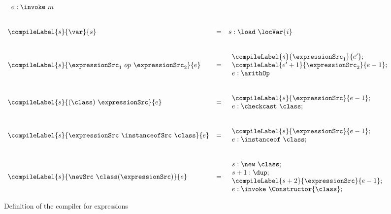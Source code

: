 \begin{figure}[ht!]
\begin{frameit}
$${\begin{array}{lll}
\begin{array}{l}
		  e  :\invoke \ m
            \end{array}  \\
	& & \\ & & \\
	\compileLabel{s}{ \var }{s} & = &   s: \load \ \locVar{i} \\
	& & \\ & & \\
	\compileLabel{s}{ \expressionSrc_1 \ op \ \expressionSrc_2 }{e} & = &  
                 \begin{array}{l}
                       \compileLabel{s}{ \expressionSrc_1}{  e'  } ; \\
                       \compileLabel{e' + 1}{ \expressionSrc_2}{ e - 1  }; \\
                       e:\arithOp
                 \end{array}  \\
	& & \\ & & \\
	\compileLabel{s}{ (\class ) \ \expressionSrc }{e} & = &  
              \begin{array}{l}  
                 \compileLabel{s}{\expressionSrc}{e  - 1};\\
                  e : \checkcast \ \class ;
              \end{array}	 \\
	& & \\ & & \\ 

	\compileLabel{s}{\expressionSrc \ \instanceofSrc \ \class }{e} & = &  
         \begin{array}{l}
              \compileLabel{s}{\expressionSrc}{ e  -1 };\\
               e : \instanceof \ \class;
	  \end{array} \\
	  & & \\ & & \\ 
\compileLabel{s}{ \newSrc \ \class  (\expressionSrc ) }{e} & = & 
                 \begin{array}{l}
                       s :    \new \ \class; \\ 
		       s + 1: \dup; \\
		       \compileLabel{s+2}{\expressionSrc}{e - 1 };\\
	               
		       e : \invoke \ \Constructor{\class};     
	       \end{array}

	\end{array} 
} $$

\caption{\sc Definition of the compiler for expressions }
\label{pogEq:compile:compExpr:defExpr}
\end{frameit}
\end{figure}

